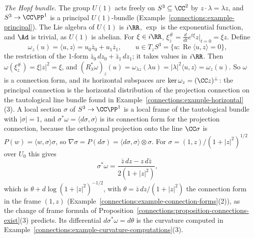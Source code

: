 \begin{example}\label{connections:example-hopf-connection}
\emph{The Hopf bundle.} The group $U(1)$ acts freely on $S^3 \subseteq \CC^2$ by $z \cdot \lambda = \lambda z$, and $S^3 \to \CC\PP^1$ is a principal $U(1)$-bundle
(Example~\ref{connections:example-principal}). The Lie algebra of $U(1)$ is $i\RR$, $\exp$ is the exponential function, and $\Ad$ is trivial, as $U(1)$ is abelian. For $\xi \in i\RR$,
$\xi^\#_z = \frac{d}{dt}e^{t\xi}z\big|_{t=0} = \xi z$. Define
\[
\omega_z(u) = \langle u, z\rangle = u_0\bar z_0 + u_1\bar z_1, \qquad u \in T_zS^3 = \{u : \operatorname{Re}\langle u, z\rangle = 0\},
\]
the restriction of the $1$-form $\bar z_0\,dz_0 + \bar z_1\,dz_1$; it takes values in $i\RR$. Then $\omega(\xi^\#_z) = \xi|z|^2 = \xi$, and
$(R_\lambda^*\omega)_z(u) = \omega_{\lambda z}(\lambda u) = |\lambda|^2\langle u, z\rangle = \omega_z(u)$. So $\omega$ is a connection form, and its horizontal subspaces are
$\ker\omega_z = (\CC z)^\perp$: the principal connection is the horizontal distribution of the projection connection on the tautological line bundle found in
Example~\ref{connections:example-horizontal}(3). A local section $\sigma$ of $S^3 \to \CC\PP^1$ is a local frame of the tautological bundle with $|\sigma| = 1$, and $\sigma^*\omega =
\langle d\sigma, \sigma\rangle$ is its connection form for the projection connection, because the orthogonal projection onto the line $\CC\sigma$ is $P(w) = \langle w, \sigma\rangle\sigma$, so
$\nabla\sigma = P(d\sigma) = \langle d\sigma, \sigma\rangle \otimes \sigma$. For $\sigma = (1, z)/(1 + |z|^2)^{1/2}$ over $U_0$ this gives
\[
\sigma^*\omega = \frac{\bar z\,dz - z\,d\bar z}{2(1 + |z|^2)},
\]
which is $\theta + d\log(1 + |z|^2)^{-1/2}$, with $\theta = \bar z\,dz/(1 + |z|^2)$ the connection form in the frame $(1, z)$ (Example~\ref{connections:example-connection-forms}(2)), as the change
of frame formula of Proposition~\ref{connections:proposition-connections-exist}(3) predicts. Its differential $d\sigma^*\omega = d\theta$ is the curvature computed in
Example~\ref{connections:example-curvature-computations}(3).
\end{example}
